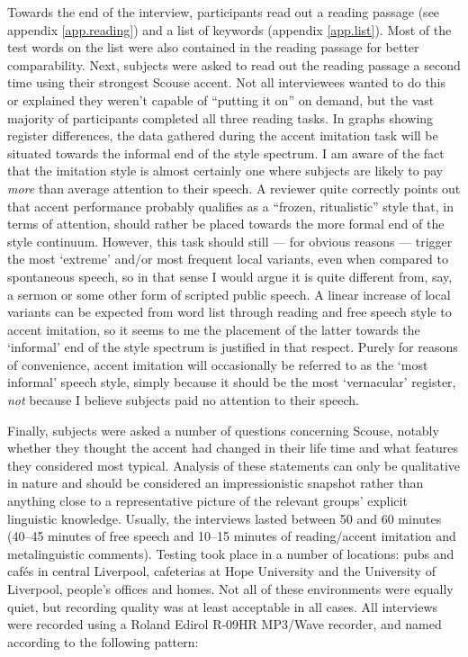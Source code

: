 Towards the end of the interview, participants read out a reading passage (see appendix \ref{app.reading}) and a list of keywords (appendix \ref{app.list}).
Most of the test words on the list were also contained in the reading passage for better comparability.
Next, subjects were asked to read out the reading passage a second time using their strongest Scouse accent. Not all interviewees wanted to do this or explained they weren't capable of ``putting it on'' on demand, but the vast majority of participants completed all three reading tasks.
In graphs showing register differences, the data gathered during the accent imitation task will be situated towards the informal end of the style spectrum.
I am aware of the fact that the imitation style is almost certainly one where subjects are likely to pay \emph{more} than average attention to their speech.
A reviewer quite correctly points out that accent performance probably qualifies as a \enquote{frozen, ritualistic} style \parencite{labov1972} that, in terms of attention, should rather be placed towards the more formal end of the style continuum.
However, this task should still --- for obvious reasons --- trigger the most \enquote*{extreme} and/or most frequent local variants, even when compared to spontaneous speech, so in that sense I would argue it is quite different from, say, a sermon or some other form of scripted public speech.
A linear increase of local variants can be expected from word list through reading and free speech style to accent imitation, so it seems to me the placement of the latter towards the \enquote*{informal} end of the style spectrum is justified in that respect.
Purely for reasons of convenience, accent imitation will occasionally be referred to as the \enquote*{most informal} speech style, simply because it should be the most \enquote*{vernacular} register, \emph{not} because I believe subjects paid no attention to their speech.

Finally, subjects were asked a number of questions concerning Scouse, notably whether they thought the accent had changed in their life time and what features they considered most typical.
Analysis of these statements can only be qualitative in nature and should be considered an impressionistic snapshot rather than anything close to a representative picture of the relevant groups' explicit linguistic knowledge. Usually, the interviews lasted between 50 and 60 minutes (40--45 minutes of free speech and 10--15 minutes of reading/accent imitation and metalinguistic comments).
Testing took place in a number of locations: pubs and cafés in central Liverpool, cafeterias at Hope University and the University of Liverpool, people's offices and homes.
Not all of these environments were equally quiet, but recording quality was at least acceptable in all cases. All interviews were recorded using a Roland Edirol R-09HR MP3/Wave recorder, and named according to the following pattern:

